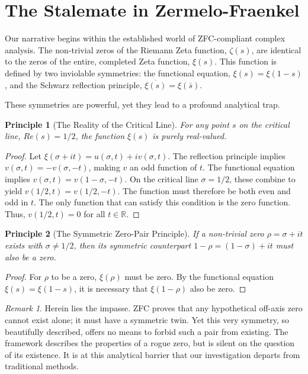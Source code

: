 \documentclass{article}
\theoremstyle{plain}
\newtheorem{principle}{Principle}[section]
\theoremstyle{definition}
\theoremstyle{remark}
\newtheorem*{remark}{Remark}
\begin{document}
\section{The Stalemate in Zermelo-Fraenkel}
\label{sec:impasse}

Our narrative begins within the established world of ZFC-compliant complex analysis. The non-trivial zeros of the Riemann Zeta function, $\zeta(s)$, are identical to the zeros of the entire, completed Zeta function, $\xi(s)$. This function is defined by two inviolable symmetries: the functional equation, $\xi(s) = \xi(1-s)$, and the Schwarz reflection principle, $\overline{\xi(s)} = \xi(\bar{s})$.

These symmetries are powerful, yet they lead to a profound analytical trap.

\begin{principle}[The Reality of the Critical Line]
For any point $s$ on the critical line, $Re(s)=1/2$, the function $\xi(s)$ is purely real-valued.
\end{principle}
\begin{proof}
Let $\xi(\sigma+it) = u(\sigma,t) + iv(\sigma,t)$. The reflection principle implies $v(\sigma,t) = -v(\sigma,-t)$, making $v$ an odd function of $t$. The functional equation implies $v(\sigma,t) = v(1-\sigma,-t)$. On the critical line $\sigma=1/2$, these combine to yield $v(1/2, t) = v(1/2, -t)$. The function must therefore be both even and odd in $t$. The only function that can satisfy this condition is the zero function. Thus, $v(1/2, t) = 0$ for all $t \in \mathbb{R}$.
\end{proof}

\begin{principle}[The Symmetric Zero-Pair Principle]
If a non-trivial zero $\rho = \sigma + it$ exists with $\sigma \neq 1/2$, then its symmetric counterpart $1-\rho = (1-\sigma)+it$ must also be a zero.
\end{principle}
\begin{proof}
For $\rho$ to be a zero, $\xi(\rho)$ must be zero. By the functional equation $\xi(s) = \xi(1-s)$, it is necessary that $\xi(1-\rho)$ also be zero.
\end{proof}

\begin{remark}
Herein lies the impasse. ZFC proves that any hypothetical off-axis zero cannot exist alone; it must have a symmetric twin. Yet this very symmetry, so beautifully described, offers no means to forbid such a pair from existing. The framework describes the properties of a rogue zero, but is silent on the question of its existence. It is at this analytical barrier that our investigation departs from traditional methods.
\end{remark}
\end{document}
